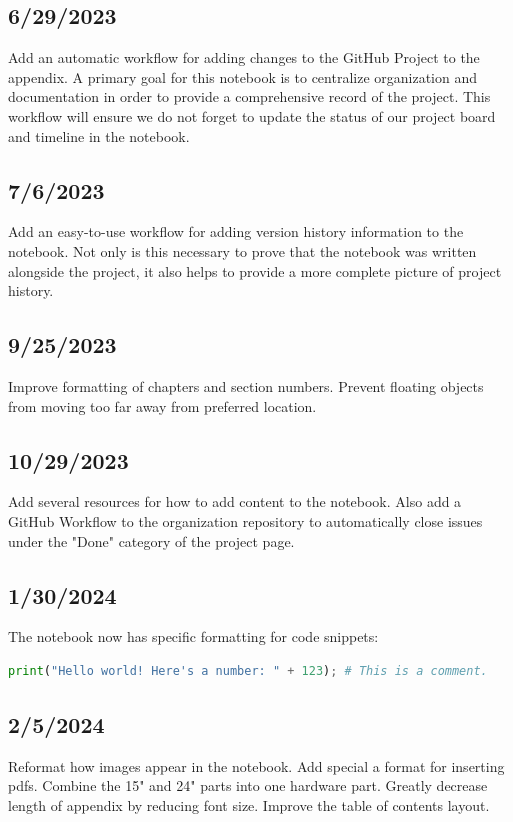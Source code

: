 \subsection{6/29/2023}
Add an automatic workflow for adding changes to the GitHub Project to the
appendix. A primary goal for this notebook is to centralize organization and
documentation in order to provide a comprehensive record of the project. This
workflow will ensure we do not forget to update the status of our project board
and timeline in the notebook.
\subsection{7/6/2023}
Add an easy-to-use workflow for adding version history information to the
notebook. Not only is this necessary to prove that the notebook was written
alongside the project, it also helps to provide a more complete picture of
project history.
\subsection{9/25/2023}
Improve formatting of chapters and section numbers. Prevent floating objects
from moving too far away from preferred location.
\subsection{10/29/2023}
Add several resources for how to add content to the notebook. Also add a GitHub
Workflow to the organization repository to automatically close issues under the
"Done" category of the project page.
\subsection{1/30/2024}
The notebook now has specific formatting for code snippets:
\begin{lstlisting}[language=Python]
    print("Hello world! Here's a number: " + 123); # This is a comment.
\end{lstlisting}
\subsection{2/5/2024}
Reformat how images appear in the notebook. Add special a format for inserting
pdfs. Combine the 15" and 24" parts into one hardware part. Greatly decrease
length of appendix by reducing font size. Improve the table of contents layout.
